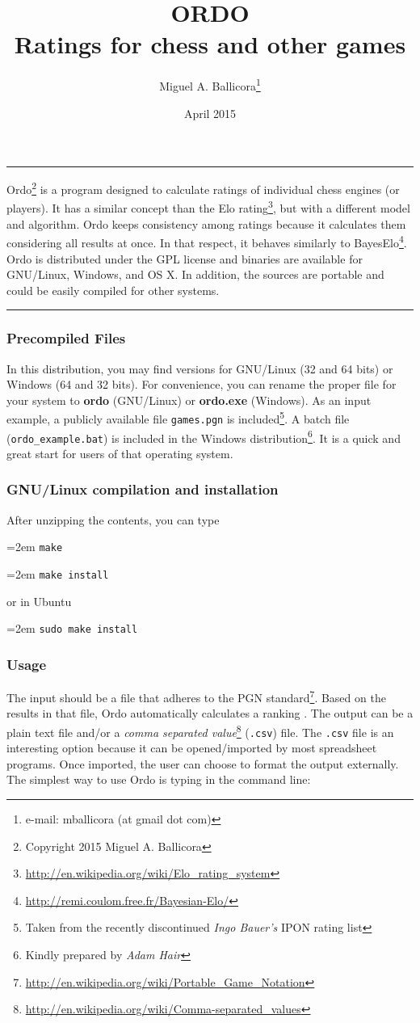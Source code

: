 \documentclass[12pt]{article}
\title{ORDO  \\ Ratings for chess and other games}
\author{Miguel A. Ballicora\footnote{e-mail: mballicora (at gmail dot com)}}
\date{April 2015}
\renewenvironment{abstract}{%
\hfill\begin{minipage}{0.95\textwidth}
\rule{\textwidth}{1pt}}
{\par\noindent\rule{\textwidth}{1pt}\end{minipage}}
\newcommand{\rgstrd} {\textsuperscript{\textregistered{}}}
\newcommand{\cpyrht} {\textsuperscript{\textcopyright{}}}
\newcommand{\person} [1] {\textit{#1}}
\newcommand{\filename} [1] {\texttt{#1}}
\newcommand{\cmdln}[1]{
	\par
	\begingroup
		\leftskip=2em
		\addtolength{\rightskip}{0em}
		\noindent \small{\texttt{#1}}
		\par
	\endgroup
}
\begin{document}
   \maketitle

\begin{abstract}
Ordo\footnote{Copyright \cpyrht{} 2015 Miguel A. Ballicora} is a program designed to calculate ratings of individual chess engines (or players).
It has a similar concept than the Elo rating\footnote{\url{http://en.wikipedia.org/wiki/Elo_rating_system}}, but with a different model and algorithm. 
Ordo keeps consistency among ratings because it calculates them considering all results at once.
In that respect, it behaves similarly to BayesElo\footnote{\url{http://remi.coulom.free.fr/Bayesian-Elo/}}.
Ordo is distributed under the GPL license and binaries are available for GNU/Linux, Windows\rgstrd{}, and OS X.
In addition, the sources are portable and could be easily compiled for other systems. 
\end{abstract}

\subsubsection*{Precompiled Files}
In this distribution, you may find versions for GNU/Linux (32 and 64 bits) or Windows\rgstrd{} (64 and 32 bits). 
For convenience, you can rename the proper file for your system to \textbf{ordo} (GNU/Linux) or \textbf{ordo.exe} (Windows\rgstrd{}). 
As an input example, a publicly available file \filename{games.pgn} is included\footnote{Taken from the recently discontinued \person{Ingo Bauer's} IPON rating list}. 
A batch file (\filename{ordo\_example.bat}) is included in the Windows\rgstrd{} distribution\footnote{Kindly prepared by \person{Adam Hair}}. 
It is a quick and great start for users of that operating system.

\subsubsection*{GNU/Linux compilation and installation}
After unzipping the contents, you can type
\cmdln{make}
\cmdln{make install} or in Ubuntu \cmdln{sudo make install}

\subsubsection*{Usage}
The input should be a file that adheres to the PGN standard\footnote{\url{http://en.wikipedia.org/wiki/Portable_Game_Notation}}. 
Based on the results in that file, Ordo automatically calculates a ranking . 
The output can be a plain text file and/or a \textit{comma separated value}\footnote{\url{http://en.wikipedia.org/wiki/Comma-separated_values}} (\filename{.csv}) file.
The \filename{.csv} file is an interesting option because it can be opened/imported by most spreadsheet programs. 
Once imported, the user can choose to format the output externally.
The simplest way to use Ordo is typing in the command line:
\end{document}
